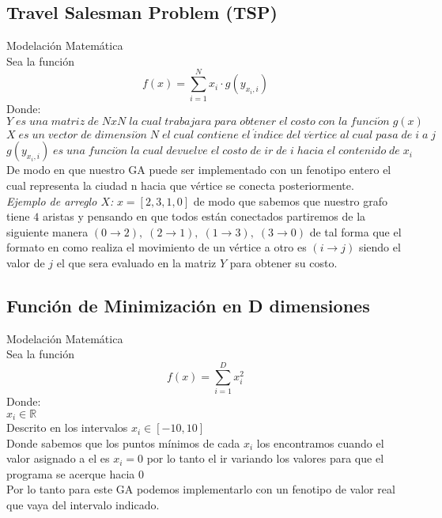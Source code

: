 \documentclass[10pt]{article}
\begin{document}
\subsection{Travel Salesman Problem (TSP)}
Modelación Matemática\\
Sea la función
\[f(x)=\sum_{i=1}^{N}x_{i} \cdot g\left(y_{x_{i},i}\right)\]
Donde:\\
\(\displaystyle Y\;es\;una\;matriz\;de\;NxN\;la\;cual\;trabajara\;para\;obtener\;el\;costo\;con\;la\;funci\acute{o}n\;g(x)\)\\\vspace{0.25cm}
\(\displaystyle X\;es\;un\;vector\;de\;dimensi\acute{o}n\;N\;el\;cual\;contiene\;el\;\acute{i}ndice\;del\;v\acute{e}rtice\;al\;cual\;pasa\;de\;i\;a\;j\)\\\vspace{0.25cm}
\(\displaystyle g(y_{x_{i},i})\;es\;una\;funci\acute{o}n\;la\;cual\;devuelve\;el\;costo\;de\;ir\;de\;i\;hacia\;el\;contenido\;de\;x_{i}\)\\\vspace{0.25cm}
De modo en que nuestro GA puede ser implementado con un fenotipo entero el cual representa la ciudad n hacia que vértice se conecta posteriormente.\\\vspace{0.25cm}
\textit{Ejemplo de arreglo $X$: }\(\displaystyle x=[2,3,1,0]\) de modo que sabemos que nuestro grafo tiene $4$ aristas y pensando en que todos están conectados partiremos de la siguiente manera $(0\rightarrow 2),\;(2\rightarrow 1),\;(1\rightarrow 3),\;(3\rightarrow 0)$ de tal forma que el formato en como realiza el movimiento de un vértice a otro es $(i\rightarrow j)$ siendo el valor de $j$ el que sera evaluado en la matriz $Y$ para obtener su costo.
\subsection{Función de Minimización en D dimensiones}
Modelación Matemática\\
Sea la función
\[f(x)=\sum_{i=1}^{D}x_{i}^{2}\]
Donde:\\
\(\displaystyle x_{i}\in\mathbb{R}\)\\\vspace{0.25cm}Descrito en los intervalos \(\displaystyle x_{i}\in[-10,10]\)\\\vspace{0.25cm}
Donde sabemos que los puntos mínimos de cada $x_{i}$ los encontramos cuando el valor asignado a el es $x_{i}=0$ por lo tanto el ir variando los valores para que el programa se acerque hacia $0$\\\vspace{0.25cm}
Por lo tanto para este GA podemos implementarlo con un fenotipo de valor real que vaya del intervalo indicado.
\end{document}
